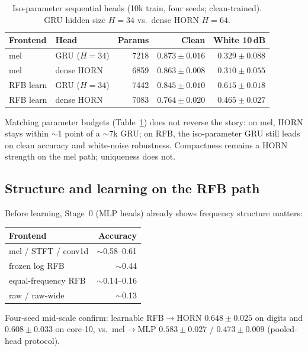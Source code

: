 \documentclass[11pt,a4paper]{article}
\begin{document}
\begin{table}[t]
\centering
\caption{Iso-parameter sequential heads (10k train, four seeds; clean-trained).
GRU hidden size $H{=}34$ vs.\ dense HORN $H{=}64$.}
\label{tab:isoparam}
\small
\begin{tabular}{@{}llrrr@{}}
\toprule
Frontend & Head & Params & Clean & White 10\,dB \\
\midrule
mel & GRU ($H{=}34$) & 7218 & $\mathbf{0.873{\pm}0.016}$ & $0.329{\pm}0.088$ \\
mel & dense HORN & 6859 & $0.863{\pm}0.008$ & $0.310{\pm}0.055$ \\
RFB learn & GRU ($H{=}34$) & 7442 & $0.845{\pm}0.010$ & $\mathbf{0.615{\pm}0.018}$ \\
RFB learn & dense HORN & 7083 & $0.764{\pm}0.020$ & $0.465{\pm}0.027$ \\
\bottomrule
\end{tabular}
\end{table}

Matching parameter budgets (Table~\ref{tab:isoparam}) does not reverse the
story: on mel, HORN stays within $\sim$1 point of a $\sim$7k GRU; on RFB, the
iso-parameter GRU still leads on clean accuracy and white-noise robustness.
Compactness remains a HORN strength on the mel path; uniqueness does not.

\subsection{Structure and learning on the RFB path}
\label{sec:structure}

Before learning, Stage~0 (MLP heads) already shows frequency structure
matters:

\begin{center}
\small
\begin{tabular}{@{}lr@{}}
\toprule
Frontend & Accuracy \\
\midrule
mel / STFT / conv1d & $\sim$0.58--0.61 \\
frozen log RFB & $\sim$0.44 \\
equal-frequency RFB & $\sim$0.14--0.16 \\
raw / raw-wide & $\sim$0.13 \\
\bottomrule
\end{tabular}
\end{center}

Four-seed mid-scale confirm: learnable RFB$\to$HORN $0.648\pm0.025$ on digits
and $0.608\pm0.033$ on core-10, vs.\ mel$\to$MLP $0.583\pm0.027$ /
$0.473\pm0.009$ (pooled-head protocol).
\end{document}
